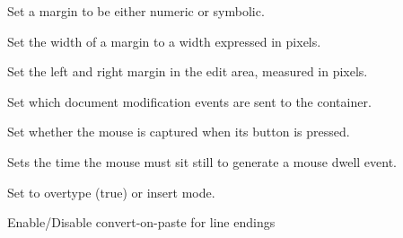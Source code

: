 \label{wxstyledtextctrlsetmargintype}


Set a margin to be either numeric or symbolic.


\label{wxstyledtextctrlsetmarginwidth}


Set the width of a margin to a width expressed in pixels.


\label{wxstyledtextctrlsetmargins}


Set the left and right margin in the edit area, measured in pixels.


\label{wxstyledtextctrlsetmodeventmask}


Set which document modification events are sent to the container.


\label{wxstyledtextctrlsetmousedowncaptures}


Set whether the mouse is captured when its button is pressed.


\label{wxstyledtextctrlsetmousedwelltime}


Sets the time the mouse must sit still to generate a mouse dwell event.


\label{wxstyledtextctrlsetovertype}


Set to overtype (true) or insert mode.


\label{wxstyledtextctrlsetpasteconvertendings}


Enable/Disable convert-on-paste for line endings


